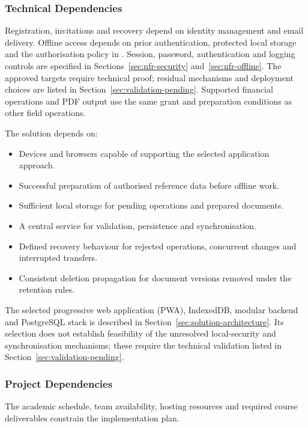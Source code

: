 \subsubsection{Technical Dependencies}
\label{sec:technical-dependencies}

Registration, invitations and recovery depend on identity management and email
delivery. Offline access depends on prior authentication, protected local storage
and the authorisation policy in \hyperref[br:002]{}. Session, password, authentication and logging controls are specified in
Sections~\ref{sec:nfr-security} and~\ref{sec:nfr-offline}. The approved targets
require technical proof; residual mechanisms and deployment choices are listed
in Section~\ref{sec:validation-pending}. Supported financial operations and PDF output use the same grant and
preparation conditions as other field operations.

The solution depends on:

\begin{itemize}
    \item Devices and browsers capable
    of supporting the selected application approach.
    \item Successful preparation of authorised
    reference data before offline work.
    \item Sufficient local storage
    for pending operations and prepared documents.
    \item A central service for validation,
    persistence and synchronisation.
    \item Defined recovery behaviour
    for rejected operations, concurrent changes
    and interrupted transfers.
    \item Consistent deletion propagation
    for document versions removed
    under the retention rules.
\end{itemize}

The selected progressive web application (PWA), IndexedDB, modular backend and PostgreSQL stack is described
in Section~\ref{sec:solution-architecture}. Its selection does not establish
feasibility of the unresolved local-security and synchronisation mechanisms;
these require the technical validation listed in Section~\ref{sec:validation-pending}.

\subsubsection{Project Dependencies}

The academic schedule, team availability,
hosting resources and required course deliverables
constrain the implementation plan.

